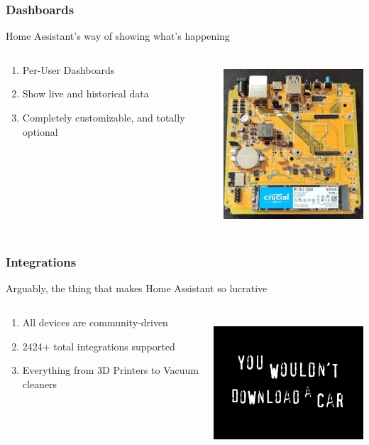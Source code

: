 \documentclass[aspectratio=169]{beamer}
\begin{document}
\begin{frame}[fragile]
  \frametitle{Dashboards}
  Home Assistant's way of showing what's happening
  \vfill
  \begin{columns}[]
    \begin{column}[T]{0.45\paperwidth}
      \begin{enumerate}%
        \item{Per-User Dashboards}
        \item{Show live and historical data}
        \item{Completely customizable, and totally optional}
      \end{enumerate}
    \end{column}
    \begin{column}[T]{0.45\paperwidth}
      \includegraphics[height=6cm,keepaspectratio]{images/yellow.jpg}
    \end{column}
  \end{columns}
\end{frame}
\begin{frame}[fragile]
  \frametitle{Integrations}
  Arguably, the thing that makes Home Assistant so lucrative
  \vfill
  \begin{columns}[]
    \begin{column}[T]{0.45\paperwidth}
      \begin{enumerate}%
        \item{All devices are community-driven}
        \item{2424+ total integrations supported}
        \item{Everything from 3D Printers to Vacuum cleaners}
      \end{enumerate}
    \end{column}
    \begin{column}[T]{0.45\paperwidth}
      \includegraphics[height=5cm,keepaspectratio]{images/download-a-car.jpg}
    \end{column}
  \end{columns}
\end{frame}
\end{document}
